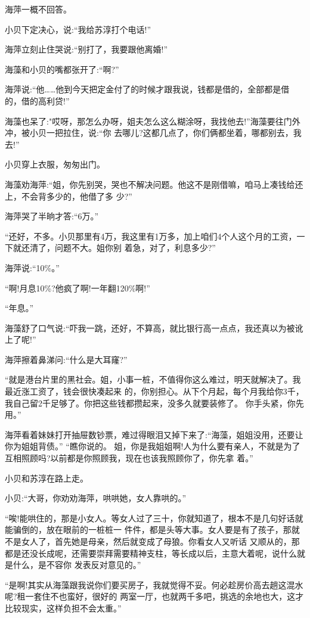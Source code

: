\documentclass[11pt,a4paper,onecolumn]{article}
\begin{document}
海萍一概不回答。

小贝下定决心，说:``我给苏淳打个电话!''

海萍立刻止住哭说:``别打了，我要跟他离婚!''

海藻和小贝的嘴都张开了:``啊?''

海萍说:``他……他到今天把定金付了的时候才跟我说，钱都是借的，全部都是借的，借的高利贷!''

海藻也呆了:"哎呀，那怎么办呀，姐夫怎么这么糊涂呀，我找他去!''海藻要往门外冲，被小贝一把拉住，说:``你
去哪儿?这都几点了，你们俩都坐着，哪都别去，我去!''

小贝穿上衣服，匆匆出门。

海藻劝海萍:``姐，你先别哭，哭也不解决问题。他这不是刚借嘛，咱马上凑钱给还上，不会背多少的，他借了多
少?''

海萍哭了半晌才答:``6万。''

``还好，不多。小贝那里有4万，我这里有1万多，加上咱们4个人这个月的工资，一下就还清了，问题不大。姐你别
着急，对了，利息多少?''

海萍说:``10\%。''

``啊!月息10\%?他疯了啊!一年翻120\%啊!''

``年息。''

海藻舒了口气说:``吓我一跳，还好，不算高，就比银行高一点点，我还真以为被讹上了呢!''

海萍擦着鼻涕问:``什么是大耳窿?''

``就是港台片里的黑社会。姐，小事一桩，不值得你这么难过，明天就解决了。我最近涨工资了，钱会很快凑起来
的，你别担心。从下个月起，每个月我给你3千，我自己留2千足够了。你把这些钱都攒起来，没多久就要装修了。
你手头紧，你先用。''

海萍看着妹妹打开抽屉数钞票，难过得眼泪又掉下来了:``海藻，姐姐没用，还要让你为姐姐背债。'' ``瞧你说的。
姐，你是我姐姐啊!人为什么要有亲人，不就是为了互相照顾吗?以前都是你照顾我，现在也该我照顾你了，你先拿
着。''

小贝和苏淳在路上走。

小贝:``大哥，你劝劝海萍，哄哄她，女人靠哄的。''

``唉!能哄住的，那是小女人。等女人过了三十，你就知道了，根本不是几句好话就能骗倒的，放在眼前的一桩桩一
件件，都是头等大事。女人要是有了孩子，那就不是女人了，首先她是母亲，然后就变成了母狼。你看女人又听话
又顺从的，那都是还没长成呢，还需要崇拜需要精神支柱，等长成以后，主意大着呢，说什么就是什么，是不容你
发表反对意见的。''

``是啊!其实从海藻跟我说你们要买房子，我就觉得不妥。何必趁房价高去趟这混水呢?租一套住不也蛮好，很好的
两室一厅，也就两千多吧，挑选的余地也大，这才比较现实，这样负担不会太重。''
\end{document}
